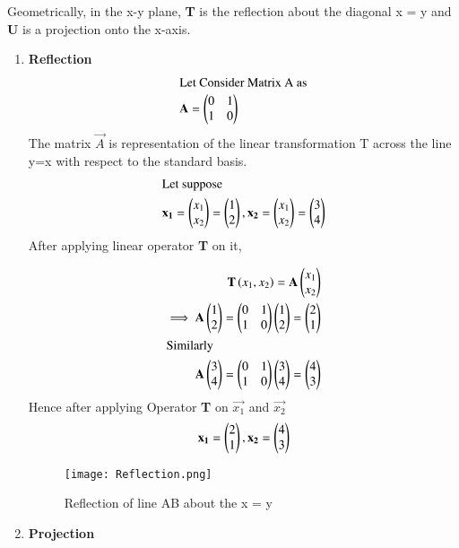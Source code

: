 \documentclass[journal,12pt,twocolumn]{IEEEtran}
\begin{document}
Geometrically, in the x-y plane, \textbf{T} is the reflection about the diagonal x = y and \textbf{U} is a projection onto the x-axis.\\ 
\begin{enumerate}
	\item \textbf{Reflection}
\begin{align}
\intertext{Let Consider Matrix A as} \mathbf{A} = \begin{pmatrix}0 & 1 \\ 1 & 0 \end{pmatrix} 
\end{align}
The matrix  $\vec{A}$ is representation  of the linear transformation T across the line y=x with respect to the standard basis.
\begin{align}
\intertext{Let suppose}\mathbf{x_1} =\begin{pmatrix}x_1 \\ x_2\end{pmatrix} = \begin{pmatrix}1 \\ 2\end{pmatrix},\mathbf{x_2} =\begin{pmatrix}x_1 \\ x_2\end{pmatrix} =\begin{pmatrix}3 \\ 4\end{pmatrix} 
\end{align}
After applying linear operator \textbf{T} on it,

\begin{align}
\textbf{T}\left(x_1, x_2\right) = \mathbf{A}\begin{pmatrix} x_1  \\ x_2\end{pmatrix}\\
\implies   \mathbf{A}\begin{pmatrix}1 \\ 2\end{pmatrix} =  \begin{pmatrix}0 & 1 \\ 1 & 0 \end{pmatrix} \begin{pmatrix}1 \\ 2\end{pmatrix} = \begin{pmatrix}2 \\ 1\end{pmatrix}\\
\intertext{Similarly}
  \mathbf{A}\begin{pmatrix}3 \\ 4\end{pmatrix} =  \begin{pmatrix}0 & 1 \\ 1 & 0 \end{pmatrix} \begin{pmatrix}3 \\ 4\end{pmatrix} = \begin{pmatrix}4 \\ 3\end{pmatrix}
  \end{align}
  Hence after  applying Operator \textbf{T} on $\vec{x_1}$ and $\vec{x_2}$
  \begin{align}
  \mathbf{x_1} = \begin{pmatrix}2\\1\end{pmatrix}, \mathbf{x_2} =\begin{pmatrix}4\\3\end{pmatrix}
\end{align}
\begin{figure}[htb!]	
	\centering	
	\texttt{[image: Reflection.png]}	
	\caption{Reflection of line AB about the  x = y}
	\label{fig1}	
\end{figure}
\item \textbf{Projection}
\end{enumerate}
\end{document}

